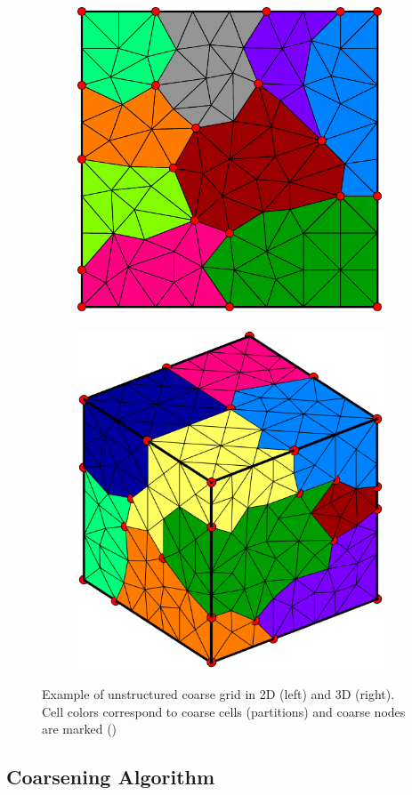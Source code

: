 \begin{figure}[htbp]
  \begin{subfigure}[t]{0.5\textwidth}
    \centerline{\includegraphics[width=0.6\linewidth]{figs/square/square_tria_coarse}}
  \end{subfigure}
  \begin{subfigure}[t]{0.5\textwidth}
    \centerline{\includegraphics[width=0.6\linewidth]{figs/MsRSB/cube_tetra_coarse}}
  \end{subfigure}
  \caption[Unstructured coarse grid examples]{\label{fig:square_coarse} Example of unstructured coarse grid in 2D (left) and 3D (right). Cell colors correspond to coarse cells (partitions) and coarse nodes are marked ()}
\end{figure}

\subsection{Coarsening Algorithm}
\label{subsec:msrsb_coarsening_algorithm}

